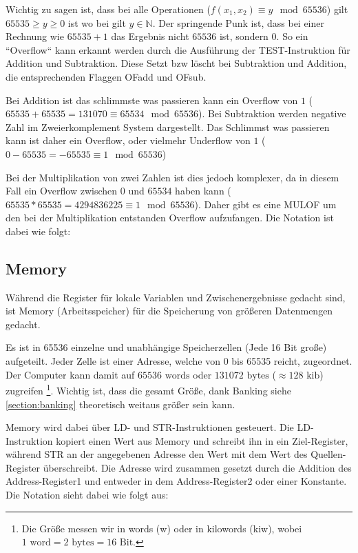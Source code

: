 \documentclass{scrartcl}
\begin{document}
Wichtig zu sagen ist, dass bei alle Operationen ($f(x_1, x_2) \equiv y \mod 65536$) gilt $65535 \ge y \ge 0$ ist wo bei gilt $y \in \mathbb{N}$.
Der springende Punk ist, dass bei einer Rechnung wie $65535 + 1$ das Ergebnis nicht $65536$ ist, sondern $0$.
So ein “Overflow“ kann erkannt werden durch die Ausführung der TEST-Instruktion für Addition und Subtraktion. Diese Setzt bzw löscht bei Subtraktion und Addition, die entsprechenden Flaggen OFadd und OFsub. 

Bei Addition ist das schlimmste was passieren kann ein Overflow von $1$ ($65535 + 65535 = 131070 \equiv 65534 \mod 65536$). Bei Subtraktion werden negative Zahl im Zweierkomplement System dargestellt. Das Schlimmst was passieren kann ist daher ein Overflow, oder vielmehr Underflow von $1$ ($0 - 65535 = -65535 \equiv 1 \mod 65536$)

Bei der Multiplikation von zwei Zahlen ist dies jedoch komplexer, da in diesem Fall ein Overflow zwischen $0$ und $65534$ haben kann ($65535 * 65535 = 4294836225 \equiv 1 \mod 65536$). Daher gibt es eine MULOF um den bei der Multiplikation entstanden Overflow aufzufangen. Die Notation ist dabei wie folgt:





\subsection{\label{section:memory}Memory}

Während die Register für lokale Variablen und Zwischenergebnisse gedacht sind, ist Memory (Arbeitsspeicher) für die Speicherung von größeren Datenmengen gedacht.

Es ist in 65536 einzelne und unabhängige Speicherzellen (Jede 16 Bit große) aufgeteilt.
Jeder Zelle ist einer Adresse, welche von 0 bis 65535 reicht, zugeordnet.
Der Computer kann damit auf $65536 \text{ words}$ oder $131072 \text{ bytes}$ ($\approx 128 \text{ kib}$) zugreifen
\footnote{Die Größe messen wir in words (w) oder in kilowords (kiw), wobei $1 \text{ word} = 2 \text{ bytes} = 16 \text{ Bit}$.}.
Wichtig ist, dass die gesamt Größe, dank Banking siehe \autoref{section:banking} theoretisch weitaus größer sein kann.

Memory wird dabei über LD- und STR-Instruktionen gesteuert.
Die LD-Instruktion kopiert einen Wert aus Memory und schreibt ihn in ein Ziel-Register, während STR an der angegebenen Adresse den Wert mit dem Wert des Quellen-Register überschreibt.
Die Adresse wird zusammen gesetzt durch die Addition des Address-Register1 und entweder in dem Address-Register2 oder einer Konstante.
Die Notation sieht dabei wie folgt aus:
\end{document}
